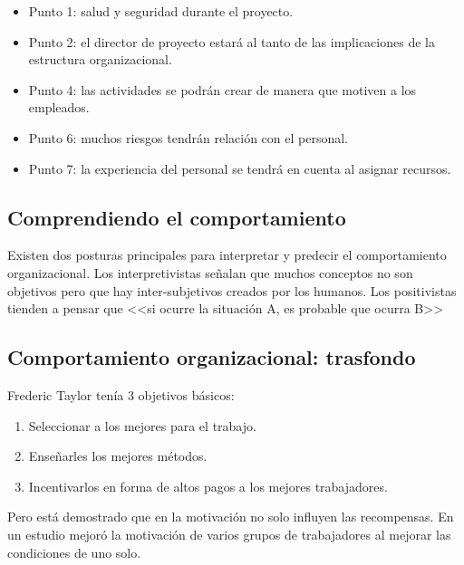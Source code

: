 \documentclass[12pt]{article}
\begin{document}
\begin{itemize}
    \item {Punto 1: salud y seguridad durante el proyecto.}
    \item {Punto 2: el director de proyecto estará al tanto de las implicaciones de la estructura organizacional.}
    \item {Punto 4: las actividades se podrán crear de manera que motiven a los empleados.}
    \item {Punto 6: muchos riesgos tendrán relación con el personal.}
    \item {Punto 7: la experiencia del personal se tendrá en cuenta al asignar recursos.}
\end{itemize}

\subsection{Comprendiendo el comportamiento}
\label{11.2.0}

{Existen dos posturas principales para interpretar y predecir el comportamiento organizacional. Los interpretivistas señalan que muchos conceptos no son objetivos pero que hay inter-subjetivos creados por los humanos. Los positivistas tienden a pensar que <<si ocurre la situación A, es probable que ocurra B>>}

\subsection{Comportamiento organizacional: trasfondo}
\label{11.3.0}

{Frederic Taylor tenía 3 objetivos básicos:}

\begin{enumerate}
    \item {Seleccionar a los mejores para el trabajo.}
    \item {Enseñarles los mejores métodos.}
    \item {Incentivarlos en forma de altos pagos a los mejores trabajadores.}
\end{enumerate}

{Pero está demostrado que en la motivación no solo influyen las recompensas. En un estudio mejoró la motivación de varios grupos de trabajadores al mejorar las condiciones de uno solo.} \bigskip
\end{document}
